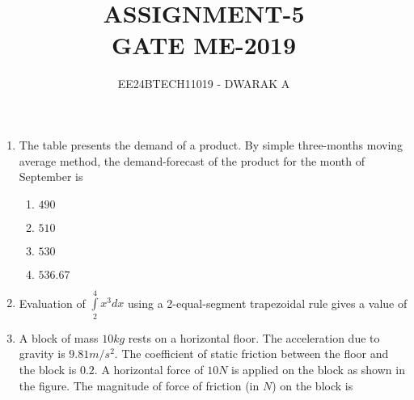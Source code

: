 \documentclass[journal]{IEEEtran}
\begin{document}

\vspace{3cm}

\title{\textbf{ASSIGNMENT-5\\GATE ME-2019}}
\author{EE24BTECH11019 - DWARAK A}
\maketitle

\bigskip

\renewcommand{\thefigure}{\theenumi}
\renewcommand{\thetable}{\theenumi}

\begin{enumerate}

\subsection*{Q.1 to Q.25 carry one mark each.}

    \item The table presents the demand of a product. By simple three-months moving average method, the demand-forecast of the product for the month of September is
        \begin{table}[!ht]
            \centering
            
        \end{table}
        \begin{enumerate}
            \item $490$
            \item $510$
            \item $530$
            \item $536.67$
        \end{enumerate}

    \item Evaluation of $\int\limits_2^4x^3dx$ using a 2-equal-segment trapezoidal rule gives a value of \underline{\hspace{1cm}}
    
    \item A block of mass $10 kg$ rests on a horizontal floor. The acceleration due to gravity is $9.81 m/s^2$. The coefficient of static friction between the floor and the block is $0.2$. A horizontal force of $10 N$ is applied on the block as shown in the figure. The magnitude of force of friction (in $N$) on the block is \underline{\hspace{1cm}}
        \begin{figure}[!ht]
            \centering
            
        \end{figure}


\end{enumerate}
\end{document}
